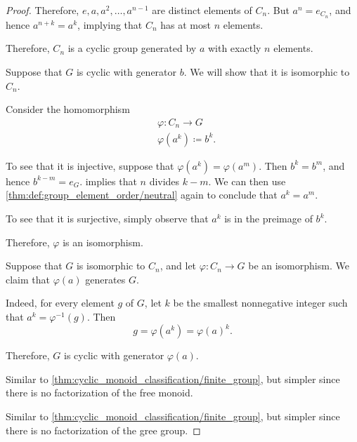 \begin{proof}
  Therefore, \( e, a, a^2, \ldots, a^{n - 1} \) are distinct elements of \( C_n \). But \( a^n = e_{C_n} \), and hence \( a^{n+k} = a^k \), implying that \( C_n \) has at most \( n \) elements.

  Therefore, \( C_n \) is a cyclic group generated by \( a \) with exactly \( n \) elements.

  \SufficiencySubProof* Suppose that \( G \) is cyclic with generator \( b \). We will show that it is isomorphic to \( C_n \).

  Consider the homomorphism
  \begin{equation*}
    \begin{aligned}
      &\varphi: C_n \to G \\
      &\varphi(a^k) \coloneqq b^k.
    \end{aligned}
  \end{equation*}

  To see that it is injective, suppose that \( \varphi(a^k) = \varphi(a^m) \). Then \( b^k = b^m \), and hence \( b^{k-m} = e_G \).  implies that \( n \) divides \( k - m \). We can then use \cref{thm:def:group_element_order/neutral} again to conclude that \( a^k = a^m \).

  To see that it is surjective, simply observe that \( a^k \) is in the preimage of \( b^k \).

  Therefore, \( \varphi \) is an isomorphism.

  \NecessitySubProof* Suppose that \( G \) is isomorphic to \( C_n \), and let \( \varphi: C_n \to G \) be an isomorphism. We claim that \( \varphi(a) \) generates \( G \).

  Indeed, for every element \( g \) of \( G \), let \( k \) be the smallest nonnegative integer such that \( a^k = \varphi^{-1}(g) \). Then
  \begin{equation*}
    g = \varphi(a^k) = \varphi(a)^k.
  \end{equation*}

  Therefore, \( G \) is cyclic with generator \( \varphi(a) \).

   Similar to \cref{thm:cyclic_monoid_classification/finite_group}, but simpler since there is no factorization of the free monoid.

   Similar to \cref{thm:cyclic_monoid_classification/finite_group}, but simpler since there is no factorization of the gree group.
\end{proof}

